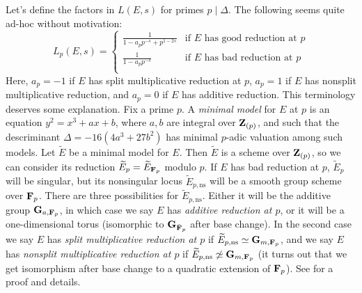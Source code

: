 Let's define the factors in $L(E,s)$ for primes $p\mid \Delta$. The following 
seems quite ad-hoc without motivation:
\[
  L_p(E,s)
    = \begin{cases}
        \displaystyle\frac{1}{1-a_p p^{-s} + p^{1-2 s}} & \text{if $E$ has good reduction at $p$}  \\
        \displaystyle\frac{1}{1-a_p p^{-s}} & \text{if $E$ has bad reduction at $p$} \\
      \end{cases}
\]
Here, $a_p=-1$ if $E$ has split multiplicative reduction at $p$, 
$a_p=1$ if $E$ has nonsplit multiplicative reduction, and $a_p=0$ if $E$ has 
additive reduction. 
This terminology deserves some explanation. Fix a prime $p$. A \emph{minimal 
model} for $E$ at $p$ is an equation $y^2=x^3+a x+b$, where $a,b$ are integral 
over $\mathbf{Z}_{(p)}$, and such that the descriminant $\Delta=-16(4 a^3+27 b^2)$ has 
minimal $p$-adic valuation among such models. Let $\widetilde E$ be a minimal 
model for $E$. Then $\widetilde E$ is a scheme over $\mathbf{Z}_{(p)}$, so we can 
consider its reduction $\widetilde E_p=\widetilde E_{\mathbf{F}_p}$ modulo $p$. If 
$E$ has bad reduction at $p$, $\widetilde E_p$ will be singular, but its 
nonsingular locus $\widetilde E_{p,\text{ns}}$ will be a smooth group scheme 
over $\mathbf{F}_p$. There are three possibilities for $\widetilde E_{p,\text{ns}}$. 
Either it will be the additive group $\mathbf{G}_{a,\mathbf{F}_p}$, in which case we say 
$E$ has \emph{additive reduction at $p$}, or it will be a one-dimensional 
torus (isomorphic to $\mathbf{G}_{\bar{\mathbf{F}}_p}$ after base change). In the second 
case we say $E$ has \emph{split multiplicative reduction at $p$} if 
$\widetilde E_{p,\text{ns}}\simeq \mathbf{G}_{m,\mathbf{F}_p}$, and we say $E$ has 
\emph{nonsplit multiplicative reduction at $p$} if 
$\widetilde E_{p,\text{ns}}\not\simeq \mathbf{G}_{m,\mathbf{F}_p}$ (it turns out that 
we get isomorphism after base change to a quadratic extension of 
$\mathbf{F}_p$). See \cite[III.2.5, 2.6]{si06} for a proof and details.  

